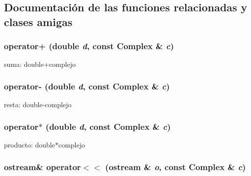 \subsection{Documentación de las funciones relacionadas y clases amigas}
\hypertarget{classComplex_9e192c9a21e15575f5d9cbf8cb93c59c}{
\subsubsection{ operator+ (double {\em d}, \/  const {\bf Complex} \& {\em c})}}
\label{classComplex_9e192c9a21e15575f5d9cbf8cb93c59c}


suma: double+complejo 

\hypertarget{classComplex_c04e31ec5cbb8643690dd6c01bab7e0b}{
\subsubsection{ operator- (double {\em d}, \/  const {\bf Complex} \& {\em c})}}
\label{classComplex_c04e31ec5cbb8643690dd6c01bab7e0b}


resta: double-complejo 

\hypertarget{classComplex_8f7c64a77e1e179f5362bbd9cf5315f6}{
\subsubsection{ operator$\ast$ (double {\em d}, \/  const {\bf Complex} \& {\em c})}}
\label{classComplex_8f7c64a77e1e179f5362bbd9cf5315f6}


producto: double$\ast$complejo 

\hypertarget{classComplex_dd2bef64469040c12f3b483f68391bba}{
\subsubsection{\setlength{\rightskip}{0pt plus 5cm}ostream\& operator$<$$<$ (ostream \& {\em o}, \/  const {\bf Complex} \& {\em c})}}
\label{classComplex_dd2bef64469040c12f3b483f68391bba}


